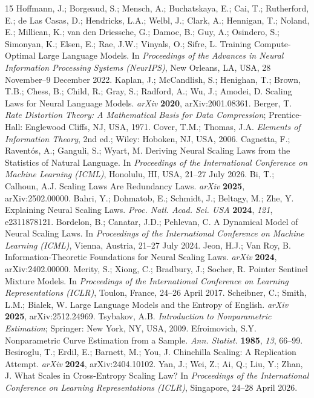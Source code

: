 \documentclass[entropy,article,submit,moreauthors,pdftex]{mdpi}
\begin{document}

\begin{thebibliography}{15}
 Hoffmann, J.; Borgeaud, S.; Mensch, A.; Buchatskaya, E.; Cai, T.; Rutherford, E.; de Las Casas, D.; Hendricks, L.A.; Welbl, J.; Clark, A.; Hennigan, T.; Noland, E.; Millican, K.; van den Driessche, G.; Damoc, B.; Guy, A.; Osindero, S.; Simonyan, K.; Elsen, E.; Rae, J.W.; Vinyals, O.; Sifre, L. Training Compute-Optimal Large Language Models. In \textit{Proceedings of the Advances in Neural Information Processing Systems (NeurIPS)}, New Orleans, LA, USA, 28 November--9 December 2022.
 Kaplan, J.; McCandlish, S.; Henighan, T.; Brown, T.B.; Chess, B.; Child, R.; Gray, S.; Radford, A.; Wu, J.; Amodei, D. Scaling Laws for Neural Language Models. \textit{arXiv} \textbf{2020}, arXiv:2001.08361.
 Berger, T. \textit{Rate Distortion Theory: A Mathematical Basis for Data Compression}; Prentice-Hall: Englewood Cliffs, NJ, USA, 1971.
 Cover, T.M.; Thomas, J.A. \textit{Elements of Information Theory}, 2nd ed.; Wiley: Hoboken, NJ, USA, 2006.
 Cagnetta, F.; Ravent{\'o}s, A.; Ganguli, S.; Wyart, M. Deriving Neural Scaling Laws from the Statistics of Natural Language. In \textit{Proceedings of the International Conference on Machine Learning (ICML)}, Honolulu, HI, USA, 21--27 July 2026.
 Bi, T.; Calhoun, A.J. Scaling Laws Are Redundancy Laws. \textit{arXiv} \textbf{2025}, arXiv:2502.00000.
 Bahri, Y.; Dohmatob, E.; Schmidt, J.; Beltagy, M.; Zhe, Y. Explaining Neural Scaling Laws. \textit{Proc. Natl. Acad. Sci. USA} \textbf{2024}, \textit{121}, e2311878121.
 Bordelon, B.; Canatar, J.D.; Pehlevan, C. A Dynamical Model of Neural Scaling Laws. In \textit{Proceedings of the International Conference on Machine Learning (ICML)}, Vienna, Austria, 21--27 July 2024.
 Jeon, H.J.; Van Roy, B. Information-Theoretic Foundations for Neural Scaling Laws. \textit{arXiv} \textbf{2024}, arXiv:2402.00000.
 Merity, S.; Xiong, C.; Bradbury, J.; Socher, R. Pointer Sentinel Mixture Models. In \textit{Proceedings of the International Conference on Learning Representations (ICLR)}, Toulon, France, 24--26 April 2017.
 Scheibner, C.; Smith, L.M.; Bialek, W. Large Language Models and the Entropy of English. \textit{arXiv} \textbf{2025}, arXiv:2512.24969.
 Tsybakov, A.B. \textit{Introduction to Nonparametric Estimation}; Springer: New York, NY, USA, 2009.
 Efroimovich, S.Y. Nonparametric Curve Estimation from a Sample. \textit{Ann. Statist.} \textbf{1985}, \textit{13}, 66--99.
 Besiroglu, T.; Erdil, E.; Barnett, M.; You, J. Chinchilla Scaling: A Replication Attempt. \textit{arXiv} \textbf{2024}, arXiv:2404.10102.
 Yan, J.; Wei, Z.; Ai, Q.; Liu, Y.; Zhan, J. What Scales in Cross-Entropy Scaling Law? In \textit{Proceedings of the International Conference on Learning Representations (ICLR)}, Singapore, 24--28 April 2026.
\end{thebibliography}
\end{document}
